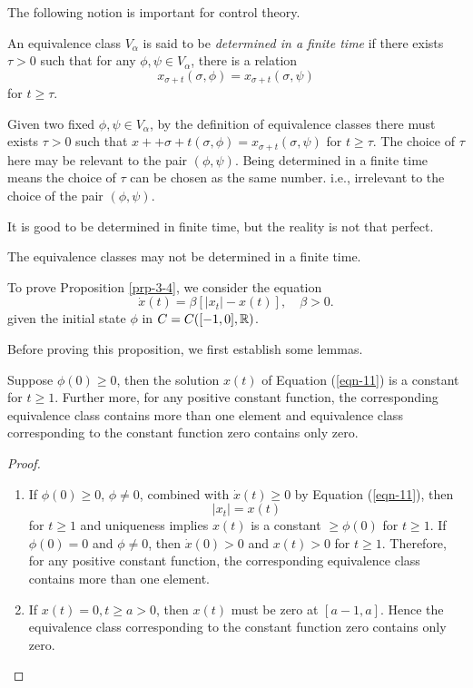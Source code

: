The following notion is important for control theory.
\begin{definition}
  An equivalence class  $V_\alpha$ is said to be \textit{determined in a finite time} if there exists $\tau >0$ such that for any $\phi,\psi \in V_\alpha$, there is a relation
  \[
    x_{\sigma+t}(\sigma,\phi)=x_{\sigma+t}(\sigma,\psi)
  \] 
  for $t\ge \tau $.
\end{definition}
Given two fixed $\phi,\psi \in  V_\alpha$, by the definition of equivalence classes there must exists $\tau >0$ such that $x++\sigma+t(\sigma,\phi)=x_{\sigma+t}(\sigma,\psi)$ for $t\ge \tau $.
The choice of $\tau $ here may be relevant to the pair $(\phi,\psi)$. Being determined in a finite time means the choice of $\tau $ can be chosen as the same number. i.e., irrelevant to the choice of the pair $(\phi,\psi)$.

It is good to be determined in finite time, but the reality is not that perfect.
\begin{proposition}\label{prp-3-4}
  The equivalence classes may not be determined in a finite time.
\end{proposition}
To prove Proposition \ref{prp-3-4}, we consider the equation
\begin{equation}
  \dot{x}(t)=\beta [|x_t|-x(t)],\quad \beta>0.\label{eqn-11}
\end{equation}
given the initial state $\phi$ in $C=C([-1,0],\mathbb{R})$.

Before proving this proposition, we first establish some lemmas.
\begin{lemma}\label{lma-3-5}
  Suppose  $\phi(0)\ge 0$, then the solution $x(t)$ of Equation (\ref{eqn-11}) is a constant for $t\ge 1$. Further more, for any positive constant function, the corresponding equivalence class contains more than one element and equivalence class corresponding to the constant function zero contains only zero. 
\end{lemma}
\begin{proof}
  \begin{enumerate}
    \item If $\phi(0)\ge 0$, $\phi\neq 0$, combined with $\dot{x}(t)\ge 0$ by Equation (\ref{eqn-11}), then 
  \[
    |x_t|=x(t)
  \] 
  for $t\ge 1$ and uniqueness implies $x(t)$ is a constant $\ge \phi(0)$ for $t\ge 1$. If $\phi\left(0 \right) =0$ and $\phi\neq 0$, then $\dot{x}(0)>0$ and $x(t)>0$ for $t\ge 1$. Therefore, for any positive constant function, the corresponding equivalence class contains more than one element.
\item If $x(t)=0,t\ge a>0$, then $x(t)$ must be zero at $[a-1,a]$. Hence the equivalence class corresponding to the constant function zero contains only zero.
  \end{enumerate}
\end{proof}

